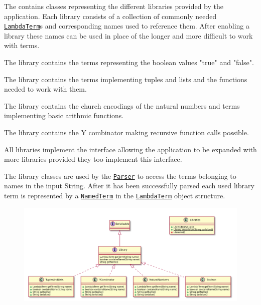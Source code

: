 The \texttt{} contains classes representing the different libraries provided by the application.
Each library consists of a collection of commonly needed \texttt{\hyperref[type:edu.kit.wavelength.client.model.term.LambdaTerm]{LambdaTerm}}s and corresponding names used to reference them.
After enabling a library  these names can be used in place of the longer and more difficult to work with terms.

The \texttt{} library contains the terms representing the boolean values "true" and "false".

The \texttt{} library contains the terms implementing tuples and lists and the functions needed to work with them.

The \texttt{} library contains the church encodings of the natural numbers and terms implementing basic arithmic functions.

The \texttt{} library contains the Y combinator making recursive function calls possible.

All libraries implement the \texttt{} interface allowing the application to be expanded with more libraries provided they too implement this interface.

The library classes are used by the \texttt{\hyperref[type:edu.kit.wavelength.client.model.term.parsing.Parser]{Parser}} to access the terms belonging to names in the input String. 
After it has been successfully parsed each used library term is represented by a \texttt{\hyperref[type:edu.kit.wavelength.client.model.term.NamedTerm]{NamedTerm}} in the \texttt{\hyperref[type:edu.kit.wavelength.client.model.term.LambdaTerm]{LambdaTerm}} object structure.

\begin{figure}[H]
	\centering
	\includegraphics[width=\textwidth]{packageDiagrams/libraryPackage}
\end{figure}